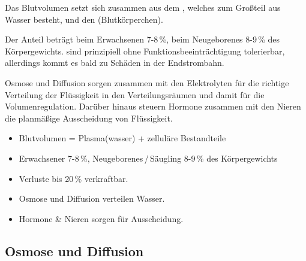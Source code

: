{%
Das Blutvolumen setzt sich zusammen aus dem , welches zum Großteil
aus Wasser besteht, und den  (Blutkörperchen).

Der Anteil beträgt beim Erwachsenen 7-8\,\%, beim
Neugeborenes 8-9\,\% des Körpergewichts.  sind
prinzipiell ohne Funktionsbeeinträchtigung tolerierbar, allerdings
kommt es bald zu Schäden in der Endstrombahn. 

Osmose und Diffusion sorgen zusammen mit den Elektrolyten für die richtige
Verteilung der Flüssigkeit in den Verteilungsräumen und damit für die
Volumenregulation. Darüber hinaus steuern Hormone zusammen mit den Nieren die
planmäßige Ausscheidung von Flüssigkeit.
}{
\begin{itemize}
  \item Blutvolumen = Plasma(wasser) + zelluläre Bestandteile
  \item Erwachsener 7-8\,\%, Neugeborenes\,/\,Säugling 8-9\,\% des Körpergewichts
  \item Verluste bis 20\,\% verkraftbar.
  \item Osmose und Diffusion verteilen Wasser.
  \item Hormone \& Nieren sorgen für Ausscheidung.
\end{itemize}
}
{}{}{}









\subsection{Osmose und Diffusion}
\label{topic:osmose}
\label{topic:diffusion}



